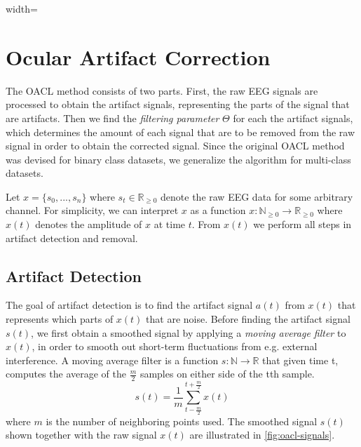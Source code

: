 \begin{figure*}%
\centering
\begin{adjustbox}{width=\textwidth}
	\newlength\figureheight
	\newlength\figurewidth
	\setlength\figureheight{6cm}
	\setlength\figurewidth{\textwidth}
	
\end{adjustbox}
\vspace{-2em}
\label{fig:oacl-signals}
\caption{Smoothed and artifact signal superimposed on the raw EEG signal for a single channel.}
\end{figure*}
\section{Ocular Artifact Correction}
The OACL method consists of two parts. First, the raw EEG signals are processed to obtain the artifact signals, representing the parts of the signal that are artifacts. Then we find the \emph{filtering parameter} $\Theta$ for each the artifact signals, which determines the amount of each signal that are to be removed from the raw signal in order to obtain the corrected signal. 
Since the original OACL method \citep{li2015ocular} was devised for binary class datasets, we generalize the algorithm for multi-class datasets. 

Let $x = \{s_0, ...,s_n\}$ where $s_t \in \mathbb{R}_{\geq 0}$ denote the raw EEG data for some arbitrary channel. For simplicity, we can interpret $x$ as a function $x : \mathbb{N}_{\geq 0} \rightarrow \mathbb{R}_{\geq 0}$ where $x(t)$ denotes the amplitude of $x$ at time $t$. 
From $x(t)$ we perform all steps in artifact detection and removal.


\subsection{Artifact Detection}
The goal of artifact detection is to find the artifact signal $a(t)$ from $x(t)$ that represents which parts of $x(t)$ that are noise. Before finding the artifact signal $s(t)$, we first obtain a smoothed signal by applying a \emph{moving average filter} to $x(t)$, in order to smooth out short-term fluctuations from e.g. external interference. A moving average filter is a function $s: \mathbb{N} \rightarrow \mathbb{R}$ that given time t, computes the average of the $\frac{m}{2}$ samples on either side of the tth sample. 
\begin{equation}
\label{eq:movavg}
s(t) = \frac{1}{m}\sum_{t-\frac{m}{2}}^{t+\frac{m}{2}}x(t)
\end{equation}
where $m$ is the number of neighboring points used. The smoothed signal $s(t)$ shown together with the raw signal $x(t)$ are illustrated in \cref{fig:oacl-signals}.

